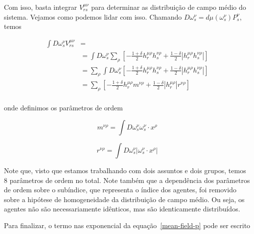 \documentclass[a4paper, 11pt]{article} %
\begin{document}
Com isso, basta integrar $V_{rs}^{\mu\nu}$ para determinar as distribuição de
campo médio do sistema. Vejamos como podemos lidar com isso. Chamando
$D\omega_s^{\nu}=d\mu(\omega_s^{\nu})P_s^{\nu}$, temos

\begin{equation}
    \begin{split}
        \int D\omega_s^{\nu}V_{rs}^{\mu\nu} & = \\
        & = \int D\omega_s^{\nu}\sum_{\rho}
        \left[-\frac{1+\delta}{2}h_r^{\mu\rho}h_s^{\nu\rho}
                      +\frac{1-\delta}{2}|h_r^{\mu\rho}h_s^{\nu\rho}|\right] \\ 
        & = \sum_{\rho}\int D\omega_s^{\nu}
        \left[-\frac{1+\delta}{2}h_r^{\mu\rho}h_s^{\nu\rho}
                      +\frac{1-\delta}{2}|h_r^{\mu\rho}h_s^{\nu\rho}|\right] \\ 
        & = \sum_{\rho}
        \left[-\frac{1+\delta}{2}h_r^{\mu\rho}m^{\nu\rho}
                      +\frac{1-\delta}{2}|h_r^{\mu\rho}|r^{\nu\rho}\right] \\ 
    \end{split}
\end{equation}

onde definimos os parâmetros de ordem

\begin{equation}\label{order-parameter-m}
    m^{\nu\rho} = \int D\omega_s^{\nu} \omega_s^{\nu} \cdot x^{\rho}
\end{equation}


\begin{equation}\label{order-parameter-r}
    r^{\nu\rho} = \int D\omega_s^{\nu} |\omega_s^{\nu} \cdot x^{\rho}|
\end{equation}

Note que, visto que estamos trabalhando com dois assuntos e dois grupos, temos
$8$ parâmetros de ordem no total. Note também que a dependência dos parâmetros
de ordem sobre o subíndice, que representa o índice dos agentes, foi removido
sobre a hipótese de homogeneidade da distribuição de campo médio. Ou seja, os
agentes não são necessariamente idênticos, mas são identicamente distribuídos.

Para finalizar, o termo nas exponencial da equação~\ref{mean-field-p} pode ser
escrito
\end{document}
